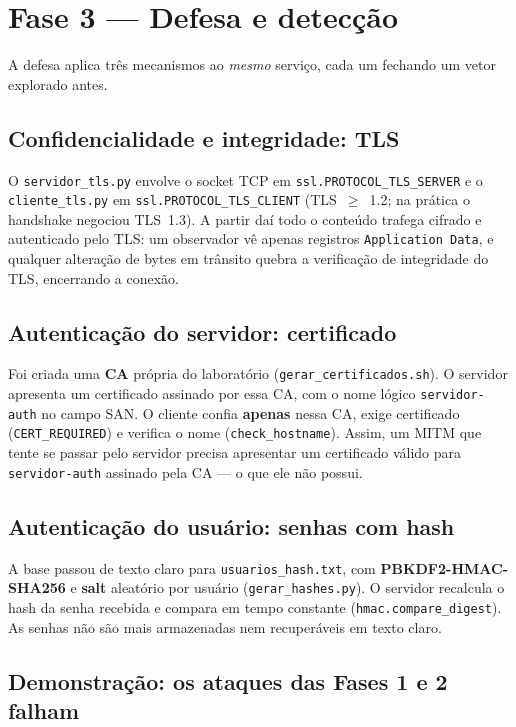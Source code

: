\documentclass[11pt,a4paper]{article}
\begin{document}
\section{Fase 3 — Defesa e detecção}

A defesa aplica três mecanismos ao \emph{mesmo} serviço, cada um fechando um
vetor explorado antes.

\subsection{Confidencialidade e integridade: TLS}
O \texttt{servidor\_tls.py} envolve o socket TCP em \texttt{ssl.PROTOCOL\_TLS\_SERVER}
e o \texttt{cliente\_tls.py} em \texttt{ssl.PROTOCOL\_TLS\_CLIENT} (TLS~$\geq$~1.2;
na prática o handshake negociou TLS~1.3). A partir daí todo o conteúdo trafega
cifrado e autenticado pelo TLS: um observador vê apenas registros
\texttt{Application Data}, e qualquer alteração de bytes em trânsito quebra a
verificação de integridade do TLS, encerrando a conexão.

\subsection{Autenticação do servidor: certificado}
Foi criada uma \textbf{CA} própria do laboratório (\texttt{gerar\_certificados.sh}).
O servidor apresenta um certificado assinado por essa CA, com o nome lógico
\texttt{servidor-auth} no campo SAN. O cliente confia \textbf{apenas} nessa CA,
exige certificado (\texttt{CERT\_REQUIRED}) e verifica o nome
(\texttt{check\_hostname}). Assim, um MITM que tente se passar pelo servidor
precisa apresentar um certificado válido para \texttt{servidor-auth} assinado
pela CA — o que ele não possui.

\subsection{Autenticação do usuário: senhas com hash}
A base passou de texto claro para \texttt{usuarios\_hash.txt}, com
\textbf{PBKDF2-HMAC-SHA256} e \textbf{salt} aleatório por usuário
(\texttt{gerar\_hashes.py}). O servidor recalcula o hash da senha recebida e
compara em tempo constante (\texttt{hmac.compare\_digest}). As senhas não são mais
armazenadas nem recuperáveis em texto claro.

\subsection{Demonstração: os ataques das Fases 1 e 2 falham}
\end{document}
